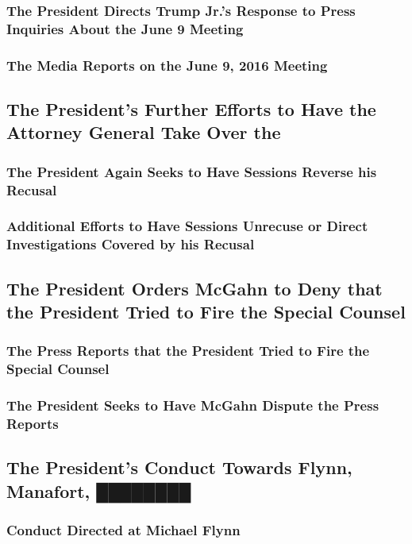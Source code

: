 \subsubsection{The President Directs Trump Jr.’s Response to Press Inquiries About the June 9 Meeting}

\subsubsection{The Media Reports on the June 9, 2016 Meeting}

\subsection{The President’s Further Efforts to Have the Attorney General Take Over the }

\subsubsection{The President Again Seeks to Have Sessions Reverse his Recusal}

\subsubsection{Additional Efforts to Have Sessions Unrecuse or Direct Investigations Covered by his Recusal}

\subsection{The President Orders McGahn to Deny that the President Tried to Fire the Special Counsel}

\subsubsection{The Press Reports that the President Tried to Fire the Special Counsel}

\subsubsection{The President Seeks to Have McGahn Dispute the Press Reports}

\subsection{The President’s Conduct Towards Flynn, Manafort, ████████}

\subsubsection{Conduct Directed at Michael Flynn}


